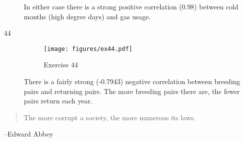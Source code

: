 \documentclass[letterpaper, landscape]{exam}
\begin{document}
\begin{description}
        In either case there is a strong positive correlation (0.98) between
        cold months (high degree days) and gas usage.

      \item[44]
        \begin{figure}[H]
          \centering
          \texttt{[image: figures/ex44.pdf]}
          \caption{Exercise 44}
        \end{figure}

        There is a fairly strong (-0.7943) negative correlation between breeding
        pairs and returning pairs.  The more breeding pairs there are, the fewer
        pairs return each year.

    \end{description}


  \else
    \vspace{10 cm}
    \begin{quote}
      \begin{em}
        The more corrupt a society, the more numerous its laws.
      \end{em}
    \end{quote}
    \hspace{1 cm} --Edward Abbey
  \fi
\end{document}
